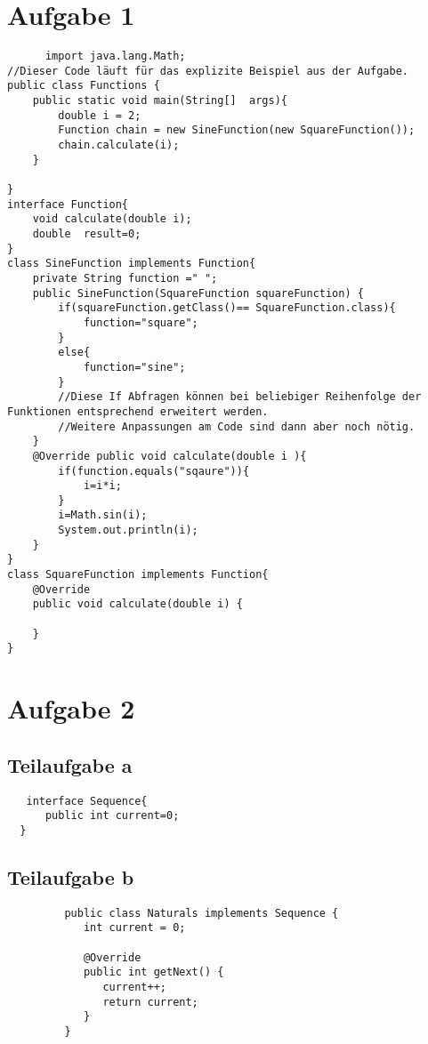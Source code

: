 \documentclass[12pt,a4paper,oneside,ngerman]{article}
\begin{document}
\section*{Aufgabe 1}
   \begin{lstlisting}
      import java.lang.Math;
//Dieser Code läuft für das explizite Beispiel aus der Aufgabe.
public class Functions {
    public static void main(String[]  args){
        double i = 2;
        Function chain = new SineFunction(new SquareFunction());
        chain.calculate(i);
    }

}
interface Function{
    void calculate(double i);
    double  result=0;
}
class SineFunction implements Function{
    private String function =" ";
    public SineFunction(SquareFunction squareFunction) {
        if(squareFunction.getClass()== SquareFunction.class){
            function="square";
        }
        else{
            function="sine";
        }
        //Diese If Abfragen können bei beliebiger Reihenfolge der Funktionen entsprechend erweitert werden.
        //Weitere Anpassungen am Code sind dann aber noch nötig.
    }
    @Override public void calculate(double i ){
        if(function.equals("sqaure")){
            i=i*i;
        }
        i=Math.sin(i);
        System.out.println(i);
    }
}
class SquareFunction implements Function{
    @Override
    public void calculate(double i) {

    }
}
\end{lstlisting}
\section{Aufgabe 2}
   \subsection*{Teilaufgabe a}
      \begin{lstlisting}
   interface Sequence{
      public int current=0;
  }  
      \end{lstlisting}
   \subsection*{Teilaufgabe b}
      \begin{lstlisting}
         public class Naturals implements Sequence {
            int current = 0;
         
            @Override
            public int getNext() {
               current++;
               return current;
            }
         }
      \end{lstlisting}
\end{document}
